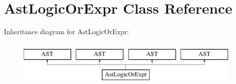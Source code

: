 \hypertarget{classAstLogicOrExpr}{\section{Ast\-Logic\-Or\-Expr Class Reference}
\label{classAstLogicOrExpr}
}
Inheritance diagram for Ast\-Logic\-Or\-Expr\-:\begin{figure}[H]
\begin{center}
\leavevmode
\includegraphics[height=2.000000cm]{classAstLogicOrExpr}
\end{center}
\end{figure}
